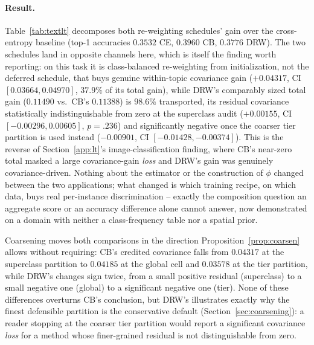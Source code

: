 \paragraph{Result.} Table~\ref{tab:textlt} decomposes both re-weighting schedules' gain
over the cross-entropy baseline (top-1 accuracies $0.3532$ CE, $0.3960$ CB, $0.3776$
DRW). The two schedules land in opposite channels here, which is itself the finding
worth reporting: on this task it is class-balanced re-weighting from initialization, not
the deferred schedule, that buys genuine within-topic covariance gain ($+0.04317$, CI
$[0.03664,0.04970]$, $37.9\%$ of its total gain), while DRW's comparably sized total gain
($0.11490$ vs.\ CB's $0.11388$) is $98.6\%$ transported, its residual covariance
statistically indistinguishable from zero at the superclass audit ($+0.00155$, CI
$[-0.00296,0.00605]$, $p=.236$) and significantly negative once the coarser tier
partition is used instead ($-0.00901$, CI $[-0.01428,-0.00374]$). This is the reverse of
Section~\ref{app:lt}'s image-classification finding, where CB's near-zero total
masked a large covariance-gain \emph{loss} and DRW's gain was genuinely covariance-driven.
Nothing about the estimator or the construction of $\phi$ changed between the two
applications; what changed is which training recipe, on which data, buys real
per-instance discrimination -- exactly the composition question an aggregate score or an
accuracy difference alone cannot answer, now demonstrated on a domain with neither a
class-frequency table nor a spatial prior.

Coarsening moves both comparisons in the direction Proposition~\ref{prop:coarsen} allows
without requiring: CB's credited covariance falls from $0.04317$ at the superclass
partition to $0.04185$ at the global cell and $0.03578$ at the tier partition, while
DRW's changes sign twice, from a small positive residual (superclass) to a small
negative one (global) to a significant negative one (tier). None of these differences
overturns CB's conclusion, but DRW's illustrates exactly why the finest defensible
partition is the conservative default (Section~\ref{sec:coarsening}): a reader stopping
at the coarser tier partition would report a significant covariance \emph{loss} for a
method whose finer-grained residual is not distinguishable from zero.

